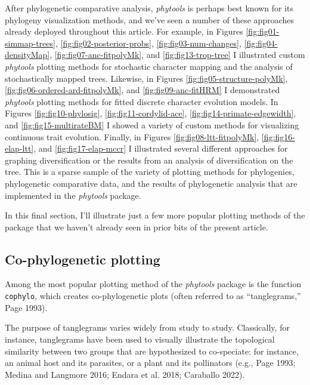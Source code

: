 \documentclass[fleqn,10pt,lineno]{wlpeerj} %
\begin{document}
After phylogenetic comparative analysis, \emph{phytools} is perhaps best known for its phylogeny visualization methods, and we've seen a number of these approaches already deployed throughout this article. For example, in Figures \ref{fig:fig01-simmap-trees}, \ref{fig:fig02-posterior-probs}, \ref{fig:fig03-num-changes}, \ref{fig:fig04-densityMap}, \ref{fig:fig07-anc-fitpolyMk}, and \ref{fig:fig13-trop-tree} I illustrated custom \emph{phytools} plotting methods for stochastic character mapping and the analysis of stochastically mapped trees. Likewise, in Figures \ref{fig:fig05-structure-polyMk}, \ref{fig:fig06-ordered-ard-fitpolyMk}, and \ref{fig:fig09-anc-fitHRM} I demonstrated \emph{phytools} plotting methods for fitted discrete character evolution models. In Figures \ref{fig:fig10-phylosig}, \ref{fig:fig11-cordylid-ace}, \ref{fig:fig14-primate-edgewidth}, and \ref{fig:fig15-multirateBM} I showed a variety of custom methods for visualizing continuous trait evolution. Finally, in Figures \ref{fig:fig08-ltt-fitpolyMk}, \ref{fig:fig16-elap-ltt}, and \ref{fig:fig17-elap-mccr} I illustrated several different approaches for graphing diversification or the results from an analysis of diversification on the tree. This is a sparse sample of the variety of plotting methods for phylogenies, phylogenetic comparative data, and the results of phylogenetic analysis that are implemented in the \emph{phytools} package.

In this final section, I'll illustrate just a few more popular plotting methods of the package that we haven't already seen in prior bits of the present article.

\hypertarget{co-phylogenetic-plotting}{%
\subsection{Co-phylogenetic plotting}\label{co-phylogenetic-plotting}}

Among the most popular plotting method of the \emph{phytools} package is the function \texttt{cophylo}, which creates co-phylogenetic plots (often referred to as ``tanglegrams,'' Page 1993).

The purpose of tanglegrams varies widely from study to study. Classically, for instance, tanglegrams have been used to visually illustrate the topological similarity between two groups that are hypothesized to co-speciate: for instance, an animal host and its parasites, or a plant and its pollinators (e.g., Page 1993; Medina and Langmore 2016; Endara et al. 2018; Caraballo 2022).
\end{document}
